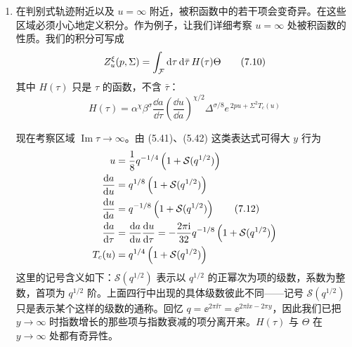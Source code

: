 \begin{enumerate}
于是被积函数中的全部因子都可写成 $\tau$ 的模函数，尽管在 $\tau=\ii\infty$、$\tau=0$ 与 $\tau=2$ 附近相应的 $q$ 展开形式各不相同。
\item 在判别式轨迹附近以及 $u=\infty$ 附近，被积函数中的若干项会变奇异。在这些区域必须小心地定义积分。作为例子，让我们详细考察 $u=\infty$ 处被积函数的性质。我们的积分可写成
\begin{equation}
Z_u^{\xi}(p,\Sigma)=\int_{\mathcal{F}}\mathrm{d}\tau\,\mathrm{d}\bar\tau\,H(\tau)\Theta
\tag{7.10}
\end{equation}
其中 $H(\tau)$ 只是 $\tau$ 的函数，不含 $\bar\tau$：
\begin{equation}
H(\tau)=\alpha^{\chi}\beta^{\sigma}\frac{\dd a}{\dd\tau}
\left(\frac{\dd u}{\dd a}\right)^{\chi/2}
\Delta^{\sigma/8}
e^{\,2pu+\Sigma^{2}T_c(u)}
\tag{7.11}
\end{equation}

现在考察区域 $\operatorname{Im}\tau\to\infty$。由 (5.41)、(5.42) 这类表达式可得大 $y$ 行为
\begin{align}
u &= \frac{1}{8}q^{-1/4}\left(1+\mathcal{S}(q^{1/2})\right) \notag\\
\frac{\mathrm{d} a}{\mathrm{d} u} &= q^{1/8}\left(1+\mathcal{S}(q^{1/2})\right) \notag\\
\frac{\mathrm{d} u}{\mathrm{d} a} &= q^{-1/8}\left(1+\mathcal{S}(q^{1/2})\right) \tag{7.12}\\
\frac{\mathrm{d} a}{\mathrm{d}\tau} &= \frac{\mathrm{d} a}{\mathrm{d} u}\frac{\mathrm{d} u}{\mathrm{d}\tau}
= -\frac{2\pi\mathrm{i}}{32}q^{-1/8}\left(1+\mathcal{S}(q^{1/2})\right) \notag\\
T_c(u) &= q^{1/4}\left(1+\mathcal{S}(q^{1/2})\right) \notag
\end{align}
这里的记号含义如下：$\mathcal{S}(q^{1/2})$ 表示以 $q^{1/2}$ 的正幂次为项的级数，系数为整数，首项为 $q^{1/2}$ 阶。上面四行中出现的具体级数彼此不同——记号 $\mathcal{S}(q^{1/2})$ 只是表示某个这样的级数的通称。回忆 $q=\ee^{2\pi\ii\tau}=\ee^{2\pi\ii x-2\pi y}$，因此我们已把 $y\to\infty$ 时指数增长的那些项与指数衰减的项分离开来。$H(\tau)$ 与 $\Theta$ 在 $y\to\infty$ 处都有奇异性。


\end{enumerate}

